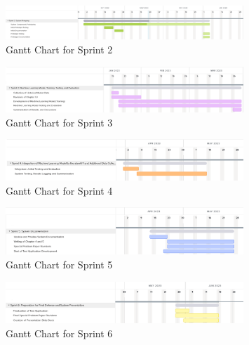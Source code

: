 \begin{figure}[ht]
    \centering
    \includegraphics[width=0.80\textwidth]{./assets/Chapter_3/Gantt/Gantt_Chart_Sprint2.png}
    \caption{Gantt Chart for Sprint 2}
    \label{fig:gantt_chart_sprint2}
\end{figure}
\FloatBarrier

\begin{figure}[ht]
    \centering
    \includegraphics[width=0.80\textwidth]{./assets/Chapter_3/Gantt/Gantt_Chart_Sprint3.png}
    \caption{Gantt Chart for Sprint 3}
    \label{fig:gantt_chart_sprint3}
\end{figure}
\FloatBarrier

\begin{figure}[ht]
    \centering
    \includegraphics[width=0.80\textwidth]{./assets/Chapter_3/Gantt/Gantt_Chart_Sprint4.png}
    \caption{Gantt Chart for Sprint 4}
    \label{fig:gantt_chart_sprint4}
\end{figure}
\FloatBarrier

\begin{figure}[ht]
    \centering
    \includegraphics[width=0.80\textwidth]{./assets/Chapter_3/Gantt/Gantt_Chart_Sprint5.png}
    \caption{Gantt Chart for Sprint 5}
    \label{fig:gantt_chart_sprint5}
\end{figure}
\FloatBarrier

\begin{figure}[ht]
    \centering
    \includegraphics[width=0.80\textwidth]{./assets/Chapter_3/Gantt/Gantt_Chart_Sprint6.png}
    \caption{Gantt Chart for Sprint 6}
    \label{fig:gantt_chart_sprint6}
\end{figure}
\FloatBarrier